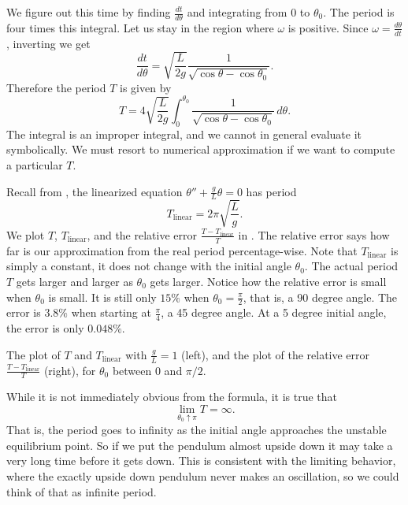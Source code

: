 We figure out this time by finding
$\frac{dt}{d\theta}$ and integrating from $0$ to $\theta_0$.
The period is four times
this integral.  Let us stay in the region where $\omega$ is positive.
Since $\omega = \frac{d\theta}{dt}$, inverting we get
\begin{equation*}
\frac{dt}{d\theta} = \sqrt{\frac{L}{2g}} \frac{1}{\sqrt{\cos \theta - \cos \theta_0 }} .
\end{equation*}
Therefore the period $T$ is given by
\begin{equation*}
T = 4 \sqrt{\frac{L}{2g}} \int_0^{\theta_0} \frac{1}{\sqrt{\cos \theta -
\cos \theta_0 }}\, d\theta .
\end{equation*}
The integral is an improper integral, and we cannot in
general evaluate it symbolically.  We must resort to numerical
approximation if we want to compute a particular $T$.

Recall from , the linearized equation $\theta''+\frac{g}{L}\theta
= 0$ has period
\begin{equation*}
T_{\text{linear}} = 2\pi \sqrt{\frac{L}{g}} .
\end{equation*}
We plot $T$, $T_{\text{linear}}$, and the relative error
$\frac{T-T_{\text{linear}}}{T}$ in .  The relative error
says how far is our approximation from the real period percentage-wise.
Note that $T_{\text{linear}}$ is simply a constant, it does not change with
the initial angle $\theta_0$.  The actual period $T$ gets larger and larger as
$\theta_0$ gets larger.
Notice how the relative error is small when $\theta_0$ is small.  It is
still only $15\%$ when $\theta_0 = \frac{\pi}{2}$, that is, a 90 degree
angle.  The error is $3.8\%$ when starting at $\frac{\pi}{4}$, 
a 45 degree angle.  At a 5 degree initial angle, the error is only $0.048 \%$.

\begin{myfig}
\capstart
\caption{The plot of $T$ and $T_{\text{linear}}$ with $\frac{g}{L} =
1$ (left), and the plot of the relative
error $\frac{T-T_{\text{linear}}}{T}$ (right), for $\theta_0$ between 0 and $\pi/2$. \label{fig:TvsT0}}
\end{myfig}

While it is not immediately obvious from the formula, it is true that
\begin{equation*}
\lim_{\theta_0 \uparrow \pi} T = \infty .
\end{equation*}
That is, the period goes to infinity as the initial angle approaches the
unstable equilibrium point.  So if we put the pendulum almost upside down it
may take a very long time before it gets down.  This is consistent with the
limiting behavior, where the exactly upside down pendulum never makes an
oscillation, so we could think of that as infinite period.

